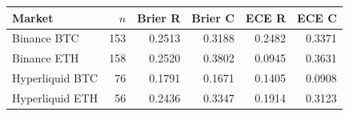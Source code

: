 \begin{tabular}{lrrrrr}
\toprule
Market & $n$ & Brier R & Brier C & ECE R & ECE C \\
\midrule
Binance BTC & 153 & 0.2513 & 0.3188 & 0.2482 & 0.3371 \\
Binance ETH & 158 & 0.2520 & 0.3802 & 0.0945 & 0.3631 \\
Hyperliquid BTC & 76 & 0.1791 & 0.1671 & 0.1405 & 0.0908 \\
Hyperliquid ETH & 56 & 0.2436 & 0.3347 & 0.1914 & 0.3123 \\
\bottomrule
\end{tabular}
